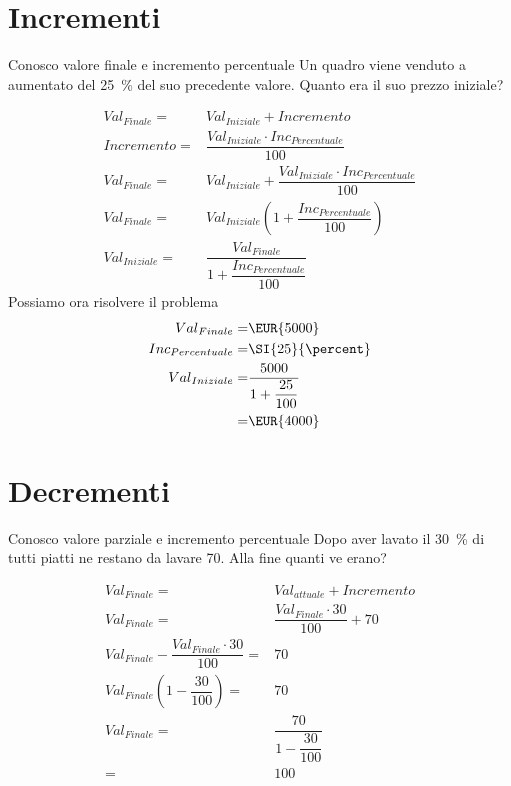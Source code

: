 \section{Incrementi}
	\begin{esempiot}{Conosco valore finale e incremento percentuale}{}
Un quadro viene venduto a   aumentato del \SI{25}{\percent} del suo precedente valore. Quanto era il suo prezzo iniziale?
\end{esempiot}
\begin{align*}
	{Val}_{Finale}=&{Val}_{Iniziale}+Incremento\\
	Incremento=&\dfrac{{Val}_{Iniziale}\cdot {Inc}_{Percentuale} }{100}\\
	{Val}_{Finale}=&{Val}_{Iniziale}+\dfrac{{Val}_{Iniziale}\cdot {Inc}_{Percentuale} }{100}\\
	{Val}_{Finale}=&{Val}_{Iniziale}\left(1+\dfrac{{Inc}_{Percentuale} }{100}\right)\\
	{Val}_{Iniziale}=&\dfrac{{Val}_{Finale}}{1+\dfrac{{Inc}_{Percentuale} }{100}}
\end{align*}
Possiamo ora risolvere il problema
\begin{align*}
	{Val}_{Finale}=&\mbox{\EUR{5000}}\\
	{Inc}_{Percentuale}=&\SI{25}{\percent}\\
	{Val}_{Iniziale}=&\dfrac{5000}{1+\dfrac{25}{100}}\\
	=&\mbox{\EUR{4000}}\\
\end{align*}
\section{Decrementi}
	\begin{esempiot}{Conosco valore parziale e incremento percentuale}{}
Dopo aver lavato il \SI{30}{\percent} di tutti piatti ne restano da lavare \num{70}. Alla fine quanti ve erano?
\end{esempiot}
\begin{align*}
	{Val}_{Finale}=&{Val}_{attuale}+Incremento\\
	{Val}_{Finale}=&\dfrac{{Val}_{Finale}\cdot 30}{100}+70\\
	{Val}_{Finale}-\dfrac{{Val}_{Finale}\cdot 30}{100}=&70\\
	{Val}_{Finale}\left(1-\dfrac{30}{100}\right)=&70\\
	{Val}_{Finale}=&\dfrac{70}{1-\dfrac{30}{100}}\\
	=&100\\
\end{align*}

